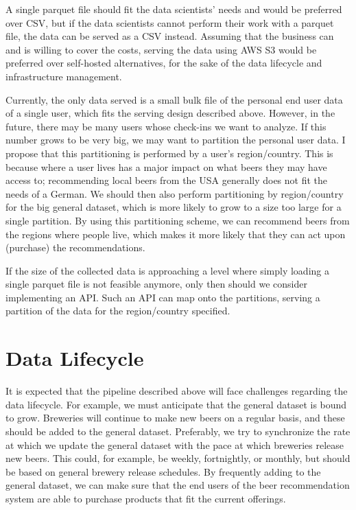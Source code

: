 \documentclass[sigconf]{acmart}
\begin{document}
A single parquet file should fit the data scientists' needs and would be preferred over CSV, but if the data scientists cannot perform their work with a parquet file, the data can be served as a CSV instead.
Assuming that the business can and is willing to cover the costs, serving the data using AWS S3 would be preferred over self-hosted alternatives, for the sake of the data lifecycle and infrastructure management.

Currently, the only data served is a small bulk file of the personal end user data of a single \citeauthor{untappd} user, which fits the serving design described above.
However, in the future, there may be many users whose check-ins we want to analyze.
If this number grows to be very big, we may want to partition the personal user data.
I propose that this partitioning is performed by a user's region/country.
This is because where a user lives has a major impact on what beers they may have access to; recommending local beers from the USA generally does not fit the needs of a German.
We should then also perform partitioning by region/country for the big general dataset, which is more likely to grow to a size too large for a single partition.
By using this partitioning scheme, we can recommend beers from the regions where people live, which makes it more likely that they can act upon (purchase) the recommendations.

If the size of the collected data is approaching a level where simply loading a single parquet file is not feasible anymore, only then should we consider implementing an API.
Such an API can map onto the partitions, serving a partition of the data for the region/country specified.

\section{Data Lifecycle}
It is expected that the pipeline described above will face challenges regarding the data lifecycle.
For example, we must anticipate that the general dataset is bound to grow.
Breweries will continue to make new beers on a regular basis, and these should be added to the general dataset.
Preferably, we try to synchronize the rate at which we update the general dataset with the pace at which breweries release new beers.
This could, for example, be weekly, fortnightly, or monthly, but should be based on general brewery release schedules.
By frequently adding to the general dataset, we can make sure that the end users of the beer recommendation system are able to purchase products that fit the current offerings.
\end{document}
